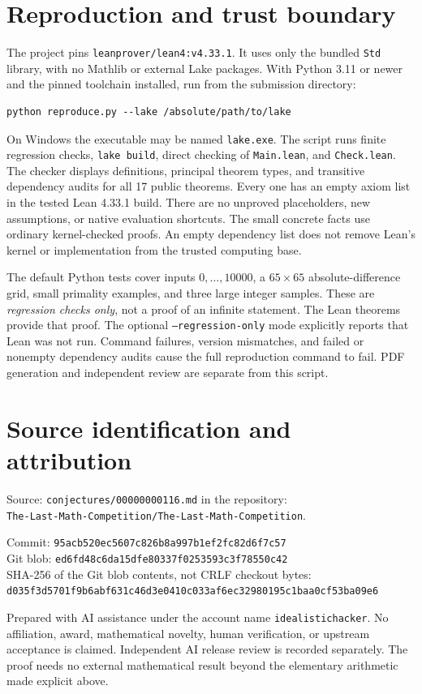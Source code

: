 \documentclass[10pt]{article}
\begin{document}
\section{Reproduction and trust boundary}
The project pins \texttt{leanprover/lean4:v4.33.1}. It uses only the bundled
\texttt{Std} library, with no Mathlib or external Lake packages.
With Python 3.11 or newer and the pinned toolchain installed, run from the
submission directory:
\begin{verbatim}
python reproduce.py --lake /absolute/path/to/lake
\end{verbatim}
On Windows the executable may be named \texttt{lake.exe}. The script runs
finite regression checks, \texttt{lake build}, direct checking of
\texttt{Main.lean}, and \texttt{Check.lean}. The checker displays definitions,
principal theorem types, and transitive dependency audits for all 17 public
theorems. Every one has an empty axiom list in the tested Lean 4.33.1 build.
There are no unproved placeholders, new assumptions, or native evaluation
shortcuts. The small concrete facts use ordinary kernel-checked proofs.
An empty dependency list does not remove Lean's kernel or implementation
from the trusted computing base.

The default Python tests cover inputs $0,\ldots,10000$, a $65\times65$
absolute-difference grid, small primality examples, and three large integer
samples. These are \emph{regression checks only}, not a proof of an infinite
statement. The Lean theorems provide that proof. The optional
\texttt{--regression-only} mode explicitly reports that Lean was not run.
Command failures, version mismatches, and failed or nonempty dependency audits
cause the full reproduction command to fail. PDF generation and independent
review are separate from this script.

\section*{Source identification and attribution}
Source: \texttt{conjectures/00000000116.md} in the repository:\\
\texttt{The-Last-Math-Competition/The-Last-Math-Competition}.
\begin{flushleft}
\small
Commit: \texttt{95acb520ec5607c826b8a997b1ef2fc82d6f7c57}\\
Git blob: \texttt{ed6fd48c6da15dfe80337f0253593c3f78550c42}\\
SHA-256 of the Git blob contents, not CRLF checkout bytes:\\
\texttt{d035f3d5701f9b6abf631c46d3e0410c033af6ec32980195c1baa0cf53ba09e6}
\end{flushleft}
Prepared with AI assistance under the account name \texttt{idealistichacker}.
No affiliation, award, mathematical novelty, human verification, or upstream
acceptance is claimed. Independent AI release review is recorded separately. The proof needs no external mathematical result beyond the elementary
arithmetic made explicit above.
\end{document}
